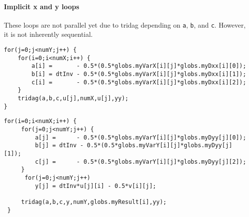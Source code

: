\paragraph{Implicit x and y loops} These loops are not parallel yet due to tridag depending on \verb!a!, \verb!b!, and \verb!c!. However,
 it is not inherently sequential.
\begin{lstlisting}[caption=Implicit x loop, label=impxloop]
for(j=0;j<numY;j++) {
    for(i=0;i<numX;i++) {
        a[i] =		 - 0.5*(0.5*globs.myVarX[i][j]*globs.myDxx[i][0]);
        b[i] = dtInv - 0.5*(0.5*globs.myVarX[i][j]*globs.myDxx[i][1]);
        c[i] =		 - 0.5*(0.5*globs.myVarX[i][j]*globs.myDxx[i][2]);
    }
    tridag(a,b,c,u[j],numX,u[j],yy);
}
\end{lstlisting}
\begin{lstlisting}[caption=Implicit y loop, label=impyloop]
for(i=0;i<numX;i++) {
     for(j=0;j<numY;j++) {
         a[j] =		 - 0.5*(0.5*globs.myVarY[i][j]*globs.myDyy[j][0]);
         b[j] = dtInv - 0.5*(0.5*globs.myVarY[i][j]*globs.myDyy[j][1]);
         c[j] =		 - 0.5*(0.5*globs.myVarY[i][j]*globs.myDyy[j][2]);
     }
      for(j=0;j<numY;j++)
         y[j] = dtInv*u[j][i] - 0.5*v[i][j];

     tridag(a,b,c,y,numY,globs.myResult[i],yy);
 }
\end{lstlisting}

